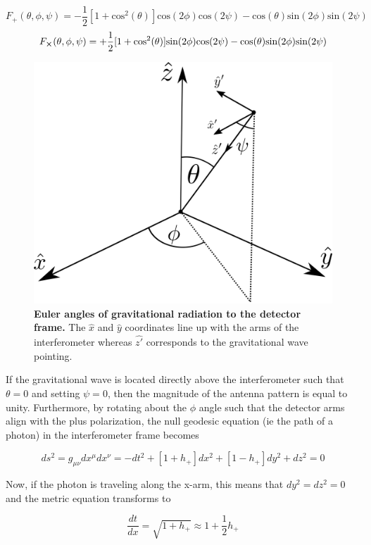 	\begin{equation}\label{Fplus}
	F_{+}(\theta,\phi,\psi) = -\frac{1}{2}[1+\text{cos}^2(\theta)] \text{cos}(2\phi) \text{cos}(2\psi) - \text{cos}(\theta) \text{sin}(2\phi) \text{sin}(2\psi)
	\end{equation}
	\begin{equation}\label{Fcross}
	F_{\cross}(\theta,\phi,\psi) = + \frac{1}{2}[1+\text{cos}^2(\theta)] \text{sin}(2\phi) \text{cos}(2\psi) - \text{cos}(\theta) \text{sin}(2\phi) \text{sin}(2\psi)
	\end{equation}
	\begin{figure}[ht]
		\centering
		\includegraphics[width=.45 \textwidth]{../Figures/EulerAngles.png}
		\caption[Detector to radiation frame.]  
		{\textbf{Euler angles of gravitational radiation to the detector frame.}  The $\hat{x}$ and $\hat{y}$ coordinates line up with the arms of the interferometer whereas $\hat{z'}$ corresponds to the gravitational wave pointing. }
		\label{fig:euler}
	\end{figure}
	If the gravitational wave is located directly above the interferometer such that $\theta = 0$ and setting $\psi=0$, then the magnitude of the antenna pattern is equal to unity.  Furthermore, by rotating about the $\phi$ angle such that the detector arms align with the plus polarization, the null geodesic equation (ie the path of a photon) in the interferometer frame becomes 
	
	\begin{equation}
	ds^2 = g_{\mu\nu}dx^{\mu} dx^{\nu} = -dt^2 + [1+h_{+}]  dx^2 + [1-h_{+}]  dy^2 + dz^2 = 0
	\end{equation}
	
	Now, if the photon is traveling along the x-arm, this means that $dy^2 = dz^2 = 0$ and the metric equation transforms to
	
	\begin{equation}
	\frac{dt}{dx} = \sqrt{ 1+h_{+} } \approx 1+\frac{1}{2} h_{+} 
	\end{equation}
	

